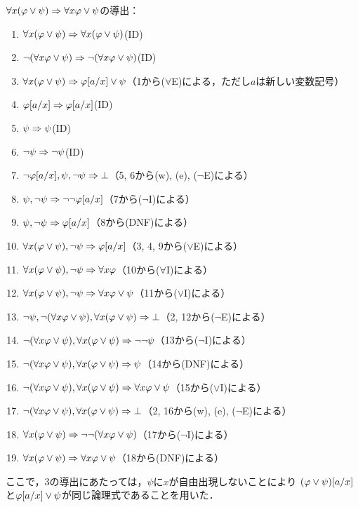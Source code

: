 \(\forall x \paren{\varphi \lor \psi} \sequent \forall x \varphi \lor \psi\)の導出：
\begin{enumerate}
	\item \(\forall x \paren{\varphi \lor \psi} \sequent \forall x \paren{\varphi \lor \psi}\)\quad (ID)
	\item \(\lnot \paren{\forall x \varphi \lor \psi} \sequent \lnot \paren{\forall x \varphi \lor \psi}\)\quad (ID)
	\item \(\forall x \paren{\varphi \lor \psi} \sequent \subst{\varphi}{a/x} \lor \psi\)\quad （1から(\(\forall\)E)による，ただし\(a\)は新しい変数記号）
	\item \(\subst{\varphi}{a/x} \sequent \subst{\varphi}{a/x}\)\quad (ID)
	\item \(\psi \Rightarrow \psi\)\quad (ID)
	\item \(\lnot \psi \Rightarrow \lnot \psi\)\quad (ID)
	\item \(\lnot \subst{\varphi}{a/x}, \psi, \lnot \psi \sequent \bot\)\quad （5, 6から(w), (e), (\(\lnot\)E)による）
	\item \(\psi, \lnot \psi \sequent \lnot \lnot \subst{\varphi}{a/x}\)\quad （7から(\(\lnot\)I)による）
	\item \(\psi, \lnot \psi \sequent \subst{\varphi}{a/x}\)\quad （8から(DNF)による）
	\item \(\forall x \paren{\varphi \lor \psi}, \lnot \psi \sequent \subst{\varphi}{a/x}\)\quad （3, 4, 9から(\(\lor\)E)による）
	\item \(\forall x \paren{\varphi \lor \psi}, \lnot \psi \sequent \forall x \varphi\)\quad （10から(\(\forall\)I)による）
	\item \(\forall x \paren{\varphi \lor \psi}, \lnot \psi \sequent \forall x \varphi \lor \psi\)\quad （11から(\(\lor\)I)による）
	\item \(\lnot \psi, \lnot \paren{\forall x \varphi \lor \psi}, \forall x \paren{\varphi \lor \psi} \sequent \bot\)\quad （2, 12から(\(\lnot\)E)による）
	\item \(\lnot \paren{\forall x \varphi \lor \psi}, \forall x \paren{\varphi \lor \psi} \sequent \lnot \lnot \psi\)\quad （13から(\(\lnot\)I)による）
	\item \(\lnot \paren{\forall x \varphi \lor \psi}, \forall x \paren{\varphi \lor \psi} \sequent \psi\)\quad （14から(DNF)による）
	\item \(\lnot \paren{\forall x \varphi \lor \psi}, \forall x \paren{\varphi \lor \psi} \sequent \forall x \varphi \lor \psi\)\quad （15から(\(\lor\)I)による）
	\item \(\lnot \paren{\forall x \varphi \lor \psi}, \forall x \paren{\varphi \lor \psi} \sequent \bot\)\quad （2, 16から(w), (e), (\(\lnot\)E)による）
	\item \(\forall x \paren{\varphi \lor \psi} \sequent \lnot \lnot \paren{\forall x \varphi \lor \psi}\)\quad （17から(\(\lnot\)I)による）
	\item \(\forall x \paren{\varphi \lor \psi} \sequent \forall x \varphi \lor \psi\)\quad （18から(DNF)による）
\end{enumerate}
ここで，3の導出にあたっては，\(\psi\)に\(x\)が自由出現しないことにより
\(\subst{\paren{\varphi \lor \psi}}{a/x}\)と\(\subst{\varphi}{a/x} \lor \psi\)が同じ論理式であることを用いた．

